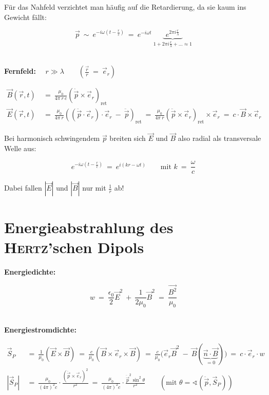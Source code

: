 \begin{enumerate}[label=\roman*)]
Für das Nahfeld verzichtet man häufig auf die Retardierung, da sie kaum ins Gewicht fällt:

\begin{equation*}
\vec{p} \ \sim \ e^{-i\omega\left(t-\frac{r}{c}\right)}  \ = \ e^{-i\omega t} \ \underbrace{\; e^{2\pi i \frac{r}{\lambda}}\;}_{1+2\pi i \frac{r}{\lambda}+\ldots \approx 1}
\end{equation*}

\ \\
\textbf{Fernfeld:} $\quad r \gg \lambda \qquad\left(\frac{\vec{r}}{r} \ = \ \vec{e}_r\right)$

\begin{align*}	
\vec{B}(\vec{r},t)  \ &= \ \frac{\mu_0}{4\pi \ r \ c} \left(\dot{\vec{p}}\times\vec{e}_r\right)_{\text{ret}}\\
\vec{E}(\vec{r},t)  \ &= \ \frac{\mu_0}{4\pi \ r} \left(\left(\ddot{\vec{p}}\cdot\vec{e}_r\right)\cdot\vec{e}_r \ - \ \ddot{\vec{p}}\right)_{\text{ret}}  \ = \ \frac{\mu_0}{4\pi \ r}\left(\ddot{\vec{p}}\times\vec{e}_r\right)_{\text{ret}}\times\vec{e}_r  \ = \ c\cdot\vec{B}\times\vec{e}_r
\end{align*}

Bei harmonisch schwingendem $\vec{p}$ breiten sich $\vec{E}$ und $\vec{B}$ also radial als transversale Welle aus:

\begin{equation*}
e^{-i\omega\left(t-\frac{r}{c}\right)}  \ = \ e^{i(kr-\omega t)} \qquad \text{mit } k  \ = \  \frac{\omega}{c}
\end{equation*}

Dabei fallen $|\vec{E}|$ und $|\vec{B}|$ nur mit $\frac{1}{r}$ ab!
\end{enumerate}


\section{Energieabstrahlung des \textsc{Hertz}'schen Dipols}

\textbf{Energiedichte:}

\begin{equation*}
w  \ = \ \frac{\epsilon_0}{2} \vec{E}^2  \ +  \ \frac{1}{2\mu_0} \vec{B}^2  \ = \ \frac{\vec{B^2}}{\mu_0}
\end{equation*}

\ \\
\textbf{Energiestromdichte:}

\begin{align*}
\vec{S}_P  \ &= \ \frac{1}{\mu_0} (\vec{E}\times\vec{B})  \ = \ \frac{c}{\mu_0} (\vec{B}\times\vec{e}_r\times\vec{B})  \ = \  \frac{c}{\mu_0}\Big(\vec{e}_r\vec{B}^2 \ - \ \vec{B}(\underbrace{\vec{n}\cdot\vec{B}}_{=0})\Big)  \ = \ c\cdot\vec{e}_r\cdot w\\
|\vec{S}_P|  \ &= \ \frac{\mu_0}{(4\pi)^2c}\cdot \frac{\left(\ddot{\vec{p}}\times\vec{e}_r\right)^2}{r^2} \ = \ \frac{\mu_0}{(4\pi)^2c}\cdot\frac{\ddot{\vec{p}}^2\sin^2\theta}{r^2} \qquad \left(\text{mit } \theta = \sphericalangle(\ddot{\vec{p}},\vec{S}_P)\right)
\end{align*}

